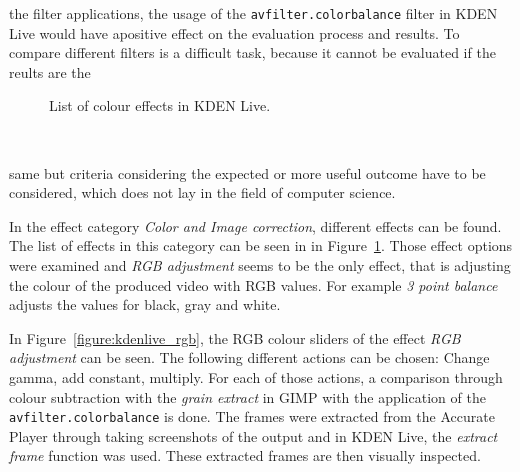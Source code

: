 \documentclass[../MasterThesis.tex]{subfiles}
\begin{document}
\vspace*{-0.8em}

the filter applications, the usage of the \texttt{avfilter.colorbalance} filter in KDEN Live would have apositive effect on the evaluation process and results. To compare different filters is a difficult task, because it cannot be evaluated if the reults are the

\vspace*{-0.6em}
\begin{minipage}{0.48\textwidth}
	
	\begin{figure}[H]
	\begin{center}
		\caption[List of colour effects in KDEN Live.]{List of colour effects in KDEN Live.}
		\label{figure:kdenlive_effekte}
	\end{center}
	\end{figure}
	\hfill
	
	
\end{minipage}\begin{minipage}{0.04\textwidth}
	\ 
\end{minipage}\begin{minipage}{0.48\textwidth}

same but criteria considering the expected or more useful outcome have to be considered, which does not lay in the field of computer science.

In the effect category \textit{Color and Image correction}, different effects can be found. The list of effects in this category can be seen in in Figure~\ref{figure:kdenlive_effekte}. Those effect options were examined and \textit{RGB adjustment} seems to be the only effect, that is adjusting the colour of the produced video with RGB values. For example \textit{3 point balance} adjusts the values for black, gray and white.

\end{minipage}

In Figure~\ref{figure:kdenlive_rgb}, the RGB colour sliders of the effect \textit{RGB adjustment} can be seen. The following different actions can be chosen: Change gamma, add constant, multiply. For each of those actions, a comparison through colour subtraction with the \textit{grain extract} in GIMP with the application of the \texttt{avfilter.colorbalance} is done.
The frames were extracted from the Accurate Player through taking screenshots of the output and in KDEN Live, the \textit{extract frame} function was used. These extracted frames are then visually inspected. 
\end{document}
